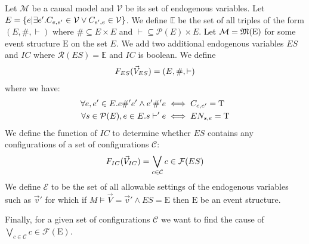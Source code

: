 Let $\mathcal{M}$ be a causal model and $\mathcal{V}$ be its set of
endogenous variables.
Let $E = \{e|\exists e'. C_{e,e'} \in \mathcal{V} \vee C_{e',e} \in \mathcal{V} \}$.
We define $\mathbb{E}$ be the set of all
triples of the form $(E,\#,\vdash)$ where $\# \subseteq E \times E$
and $\vdash \subseteq \mathcal{P}(E) \times E$.
Let $\mathcal{M} = \mathfrak{M}(\mathrm{E})$ for some event structure
$\mathrm{E}$ on the set $E$.
We add two additional endogenous variables $ES$ and $IC$
where $\mathcal{R}(ES) = \mathbb{E}$ and $IC$ is boolean.
We define
\begin{align*}
    F_{ES}(\vec V_{ES}) = (E,\#,\vdash)
\end{align*}
where we have:
\begin{align*}
    \forall e,e' \in E. e \#' e' \wedge e' \#' e
     & \iff C_{e,e'} = \mathrm{T} \\
    \forall s \in \mathcal{P}(E), e \in E.  s \vdash' e
     & \iff EN_{s,e} = \mathrm{T}
\end{align*}
We define the function of $IC$ to determine whether $ES$
contains any configurations of a set of configurations 
$\mathcal{C}$:
\begin{align*}
    F_{IC}(\vec V_{IC}) = \bigvee_{c \in \mathcal{C}}c \in \mathcal{F}(ES)
\end{align*}
We define $\mathcal{E}$ to be the set of all allowable
settings of the endogenous variables such as $\vec v'$
for which if $M \vDash \vec V = \vec v' \wedge ES = \mathrm{E}$ then $\mathrm{E}$ be an event structure.

Finally, for a given set of configurations $\mathcal{C}$
we want to find the cause of 
$\bigvee_{c \in \mathcal{C}}c \in \mathcal{F}(\mathrm{E})$.

